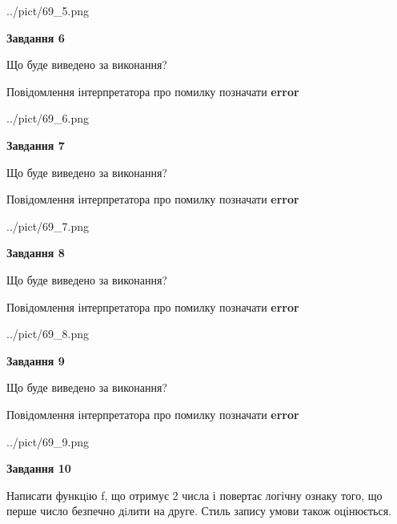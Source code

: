\documentclass[12pt, ukrainian]{article}
\begin{document}
{\begin {large}
\begin{center}
	{../pict/69_5.png}
\end{center}
\newpage

{\begin {center}\textbf{Завдання 6}\end {center}}\par
Що буде виведено за виконання? \par
Повідомлення інтерпретатора про помилку позначати \textbf{error}

\begin{center}
	{../pict/69_6.png}
\end{center}
\newpage

{\begin {center}\textbf{Завдання 7}\end {center}}\par
Що буде виведено за виконання? \par
Повідомлення інтерпретатора про помилку позначати \textbf{error}

\begin{center}
	{../pict/69_7.png}
\end{center}
\newpage

{\begin {center}\textbf{Завдання 8}\end {center}}\par
Що буде виведено за виконання? \par
Повідомлення інтерпретатора про помилку позначати \textbf{error}

\begin{center}
	{../pict/69_8.png}
\end{center}
\newpage

{\begin {center}\textbf{Завдання 9}\end {center}}\par
Що буде виведено за виконання? \par
Повідомлення інтерпретатора про помилку позначати \textbf{error}

\begin{center}
	{../pict/69_9.png}
\end{center}
\newpage

{\begin {center}\textbf{Завдання 10}\end {center}}\par

Написати функцiю f, що отримує 2 числа і повертає логічну ознаку того, що перше число безпечно дiлити на друге. Стиль запису умови також оцінюється.\par
\newpage

\end {large}}
\end{document}
